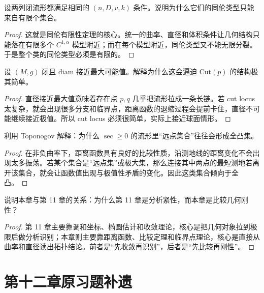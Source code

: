 \documentclass[11pt,a4paper,openany]{ctexbook}
\numberwithin{equation}{chapter}
\begin{document}
\begin{exercise}
设两列闭流形都满足相同的 \((n,D,v,k)\) 条件。说明为什么它们的同伦类型只能来自有限个集合。
\end{exercise}
\begin{proof}
这就是同伦有限性定理的核心。统一的曲率、直径和体积条件让几何结构只能落在有限多个 \(C^{1,\alpha}\) 模型附近；而在每个模型附近，同伦类型又不能无限分裂。于是整个类的同伦类型必须是有限的。  
\end{proof}

\begin{exercise}
设 \((M,g)\) 闭且 \(\mathrm{diam}\) 接近最大可能值。解释为什么这会逼迫 \(\mathrm{Cut}(p)\) 的结构极其简单。
\end{exercise}
\begin{proof}
直径接近最大值意味着存在点 \(p,q\) 几乎把流形拉成一条长链。若 cut locus 太复杂，就会出现很多分支和临界点，距离函数的退缩过程会提前卡住，直径不可能继续接近极值。所以 cut locus 必须很简单，实际上接近球面情形。  
\end{proof}

\begin{exercise}
利用 Toponogov 解释：为什么 \(\sec\ge 0\) 的流形里“远点集合”往往会形成全凸集。
\end{exercise}
\begin{proof}
在非负曲率下，距离函数具有良好的比较性质，沿测地线的距离变化不会出现太多振荡。若某个集合是“远点集”或极大集，那么连接其中两点的最短测地若离开该集合，就会让函数值出现与极值性矛盾的变化。因此这类集合倾向于全凸。  
\end{proof}

\begin{exercise}
说明本章与第 11 章的关系：为什么第 11 章是分析紧性，而本章是比较几何刚性？
\end{exercise}
\begin{proof}
第 11 章主要靠调和坐标、椭圆估计和收敛理论，核心是把几何对象拉到极限后做分析识别；本章则主要靠距离函数、比较定理和临界点理论，核心是直接从曲率和直径读出拓扑结论。前者是“先收敛再识别”，后者是“先比较再刚性”。  
\end{proof}

\section{第十二章原习题补遗}
\end{document}
